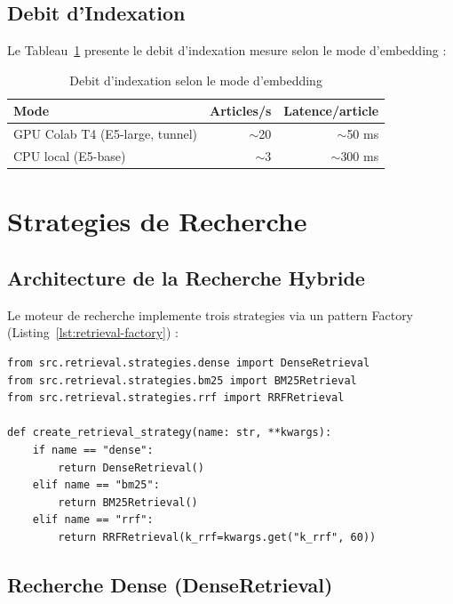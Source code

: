 \subsection{Debit d'Indexation}

Le Tableau~\ref{tab:indexation-debit} presente le debit d'indexation mesure selon le mode d'embedding :

\begin{table}[h]
\centering
\renewcommand{\arraystretch}{1.3}
\begin{tabular}{|l|r|r|}
\hline
\rowcolor{LightBlue}
\textbf{\color{PrimaryBlue}Mode} & \textbf{\color{PrimaryBlue}Articles/s} & \textbf{\color{PrimaryBlue}Latence/article} \\
\hline
GPU Colab T4 (E5-large, tunnel) & $\sim$20 & $\sim$50 ms \\
CPU local (E5-base) & $\sim$3 & $\sim$300 ms \\
\hline
\end{tabular}
\caption{Debit d'indexation selon le mode d'embedding}
\label{tab:indexation-debit}
\end{table}

\section{Strategies de Recherche}

\subsection{Architecture de la Recherche Hybride}

Le moteur de recherche implemente trois strategies via un pattern Factory (Listing~\ref{lst:retrieval-factory}) :

\begin{verbatim}
from src.retrieval.strategies.dense import DenseRetrieval
from src.retrieval.strategies.bm25 import BM25Retrieval
from src.retrieval.strategies.rrf import RRFRetrieval

def create_retrieval_strategy(name: str, **kwargs):
    if name == "dense":
        return DenseRetrieval()
    elif name == "bm25":
        return BM25Retrieval()
    elif name == "rrf":
        return RRFRetrieval(k_rrf=kwargs.get("k_rrf", 60))
\end{verbatim}
\label{lst:retrieval-factory}

\subsection{Recherche Dense (DenseRetrieval)}

